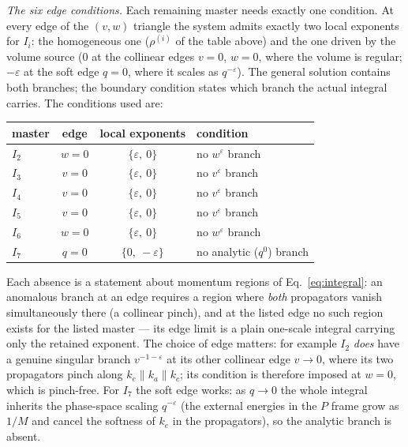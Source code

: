 \documentclass[11pt]{article}
\newcommand{\eps}{\varepsilon}
\begin{document}
\emph{The six edge conditions.}  Each remaining master needs
exactly one condition.  At every edge of the $(v,w)$ triangle the
system admits exactly two local exponents for $I_i$: the homogeneous
one ($\rho^{(i)}$ of the table above) and the one driven by the
volume source ($0$ at the collinear edges $v{=}0$, $w{=}0$, where the
volume is regular; $-\eps$ at the soft edge $q{=}0$, where it scales
as $q^{-\eps}$).  The general solution contains both branches; the
boundary condition states which branch the actual integral carries.
The conditions used are:
\begin{center}
\renewcommand{\arraystretch}{1.25}
\begin{tabular}{lccl}
\toprule
master & edge & local exponents & condition \\
\midrule
$I_2$ & $w=0$ & $\{\eps,\ 0\}$ & no $w^{\eps}$ branch \\
$I_3$ & $v=0$ & $\{\eps,\ 0\}$ & no $v^{\eps}$ branch \\
$I_4$ & $v=0$ & $\{\eps,\ 0\}$ & no $v^{\eps}$ branch \\
$I_5$ & $v=0$ & $\{\eps,\ 0\}$ & no $v^{\eps}$ branch \\
$I_6$ & $w=0$ & $\{\eps,\ 0\}$ & no $w^{\eps}$ branch \\
$I_7$ & $q=0$ & $\{0,\ -\eps\}$ &
  no analytic ($q^{0}$) branch \\
\bottomrule
\end{tabular}
\end{center}
Each absence is a statement about momentum regions of
Eq.~\eqref{eq:integral}: an anomalous branch at an edge requires a
region where \emph{both} propagators vanish simultaneously there (a
collinear pinch), and at the listed edge no such region exists for
the listed master --- its edge limit is a plain one-scale integral
carrying only the retained exponent.  The choice of edge matters: for
example $I_2$ \emph{does} have a genuine singular branch
$v^{-1-\eps}$ at its other collinear edge $v \to 0$, where its two
propagators pinch along $k_e \parallel k_a \parallel k_c$; its
condition is therefore imposed at $w = 0$, which is pinch-free.  For
$I_7$ the soft edge works: as $q \to 0$ the whole integral inherits
the phase-space scaling $q^{-\eps}$ (the external energies in the
$P$ frame grow as $1/M$ and cancel the softness of $k_e$ in the
propagators), so the analytic branch is absent.
\end{document}

